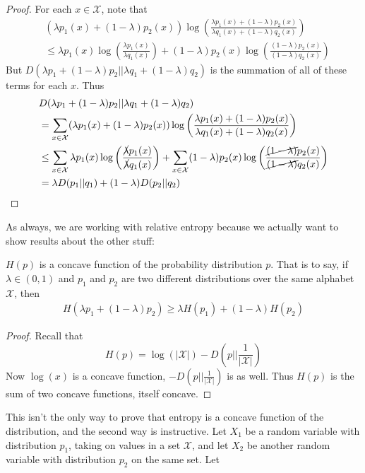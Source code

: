 \begin{proof}
	For each $x \in \mathcal{X}$, note that
\begin{align}
	& (\lambda p_1(x) + (1-\lambda)p_2(x))\log\left(\frac{\lambda p_1(x)+(1-\lambda)p_2(x)}{\lambda q_1(x) + (1-\lambda)q_2(x)} \right) \\
	&\leq \lambda p_1(x)\log\left(\frac{\lambda p_1(x)}{\lambda q_1(x)} \right) + (1-\lambda)p_2(x)\log\left(\frac{(1-\lambda)p_2(x)}{(1-\lambda)q_2(x)} \right) 
\end{align}
But $D(\lambda p_1 + (1-\lambda)p_2|| \lambda q_1 + (1-\lambda)q_2)$ is the summation of all of these terms for each $x$. Thus
\begin{align}
	& D(\lambda p_1 + (1-\lambda)p_2|| \lambda q_1 + (1-\lambda)q_2) \\ &= \sum_{x \in \mathcal{X}} (\lambda p_1(x) + (1-\lambda)p_2(x))\log\left(\frac{\lambda p_1(x)+(1-\lambda)p_2(x)}{\lambda q_1(x) + (1-\lambda)q_2(x)} \right) \\
	 &\leq \sum_{x \in \mathcal{X}} \lambda p_1(x)\log\left(\frac{\cancel{\lambda} p_1(x)}{\cancel{\lambda} q_1(x)} \right) + \sum_{x \in \mathcal{X}}(1-\lambda)p_2(x)\log\left(\frac{\cancel{(1-\lambda)}p_2(x)}{\cancel{(1-\lambda)}q_2(x)} \right) \\
	 &= \lambda D( p_1||q_1) + (1-\lambda) D( p_2 || q_2)
\end{align}
\end{proof}
As always, we are working with relative entropy because we actually want to show results about the other stuff:
\begin{theorem}
	$H(p)$ is a concave function of the probability distribution $p$. That is to say, if $\lambda \in (0,1)$ and $p_1$ and $p_2$ are two different distributions over the same alphabet $\mathcal{X}$, then 
\begin{align}
 H(\lambda p_1 + (1-\lambda)p_2) \geq \lambda H(p_1) + (1-\lambda)H(p_2) 
\end{align}
\end{theorem}
\begin{proof}
	Recall that
	\[	H(p) = \log(|\mathcal{X}|)-D\left( p||\frac{1}{|\mathcal{X}|} \right)\]
Now $\log(x)$ is a concave function, $-D(p||\frac{1}{|\mathcal{X}|})$ is as well. Thus $H(p)$ is the sum of two concave functions, itself concave. 
\end{proof}
This isn't the only way to prove that entropy is a concave function of the distribution, and the second way is instructive. Let $X_1$ be a random variable with distribution $p_1$, taking on values in a set $\mathcal{X}$, and let $X_2$ be another random variable with distribution $p_2$ on the same set. Let 
